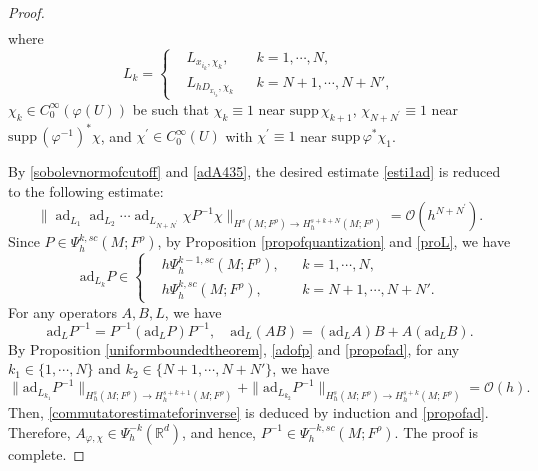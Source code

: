 \documentclass[11pt,oneside,reqno]{amsart}
\newcommand\R{\ensuremath{\mathbb{R}}}
\theoremstyle{definition}
\numberwithin{equation}{section}
\theoremstyle{plain}
\begin{document}
\begin{proof}
\begin{equation}
\begin{aligned}
\end{aligned}
\end{equation}
where
\begin{equation*}L_k=\left\{
    \begin{aligned}
        & L_{x_{i_k}, \chi_k} ,&& k = 1,\cdots,N, \\
        & L_{hD_{x_{i_k}},\chi_k} && k = N+1, \cdots, N+N',
    \end{aligned}\right.
\end{equation*}
$\chi_k \in C_{0}^{\infty}(\varphi(U))$ be such that $\chi_k\equiv 1$ near $\mathrm{supp}\,\chi_{k+1}$, $\chi_{N+N^{\prime}}\equiv 1$ near $\mathrm{supp}\,(\varphi^{-1})^*\chi$, and $\chi^{\prime}\in C_{0}^{\infty}(U)$ with $\chi^{\prime}\equiv 1$ near $\mathrm{supp}\,\varphi^*\chi_1$.

By \eqref{sobolevnormofcutoff} and \eqref{adA435}, the desired estimate \eqref{esti1ad} is reduced to the following estimate:
\begin{equation}\label{commutatorestimateforinverse}
\| \operatorname{ad}_{L_{1}}\operatorname{ad}_{L_{2}}\cdots\operatorname{ad}_{L_{N+N^{\prime}}}\chi P^{-1}\chi \|_{H^{s} (M;F^\rho ) \rightarrow H_h^{s+k+N} (M;F^{\rho} )}=\mathcal{O} (h^{N+N^{\prime}} ).
\end{equation}
Since $P \in \Psi^{k,sc}_{h}(M;F^\rho)$, by Proposition \ref{propofquantization} and \eqref{proL}, we have
\begin{equation}\label{adofp}
\mathrm{ad}_{L_k}P \in \left\{
\begin{aligned}
    &h\Psi^{k-1,sc}_{h}(M;F^\rho),  && k=1,\cdots,N, \\
    &h\Psi^{k,sc}_{h}(M;F^\rho) ,&& k= N+1,\cdots,N+N'.
\end{aligned}\right.
\end{equation}
For any operators $A,B,L$, we have
\begin{equation}\label{propofad}
\mathrm{ad}_{L}P^{-1}=P^{-1}(\mathrm{ad}_{L}P)P^{-1},\quad \mathrm{ad}_{L}(AB)=(\mathrm{ad}_{L}A)B+A(\mathrm{ad}_{L}B).
\end{equation}
By Proposition \ref{uniformboundedtheorem}, \eqref{adofp} and \eqref{propofad}, for any $k_1 \in\{1,\cdots, N\}$ and $k_2\in\{ N+1,\cdots ,N+N'\}$, we have
\begin{equation*}
    \|\mathrm{ad}_{L_{k_1}}P^{-1}\|_{H^{s}_h(M;F^\rho)\to H^{s+k+1}_h(M;F^\rho)} + \|\mathrm{ad}_{L_{k_2}}P^{-1}\|_{H^{s}_h(M;F^\rho)\to H^{s+k}_h(M;F^\rho)}= \mathcal{O}(h) .
\end{equation*}
Then, \eqref{commutatorestimateforinverse} is deduced by induction and \eqref{propofad}. Therefore, $A_{\varphi,\chi}\in \Psi^{-k}_{h}(\R^d)$, and hence, $P^{-1}\in \Psi^{-k,sc}_h(M;F^\rho)$. The proof is complete.
\end{proof}
\end{document}
